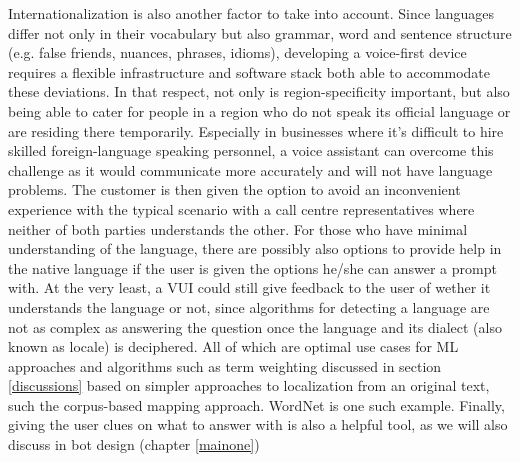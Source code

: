 Internationalization is also another factor to take into account. Since languages differ not only in their vocabulary but also grammar, word and sentence structure (e.g. false friends, nuances, phrases, idioms), developing a voice-first device requires a flexible infrastructure and software stack both able to accommodate these deviations.
In that respect, not only is region-specificity important, but also being able to cater for people in a region who do not speak its official language or are residing there temporarily.
Especially in businesses where it's difficult to hire skilled foreign-language speaking personnel, a voice assistant can overcome this challenge as it would communicate more accurately and will not have language problems.
The customer is then given the option to avoid an inconvenient experience with the typical scenario with a call centre representatives where neither of both parties understands the other.
For those who have minimal understanding of the language, there are possibly also options to provide help in the native language if the user is given the options he/she can answer a prompt with. At the very least, a VUI could still give feedback to the user of wether it understands the language or not, since algorithms for detecting a language are not as complex as answering the question once the language and its dialect (also known as locale) is deciphered. %
All of which are optimal use cases for ML approaches and algorithms such as term weighting discussed in section \ref{discussions} based on simpler approaches to localization from an original text, such the corpus-based mapping approach. WordNet is one such example. %
Finally, giving the user clues on what to answer with is also a helpful tool, as we will also discuss in bot design (chapter \ref{mainone})



